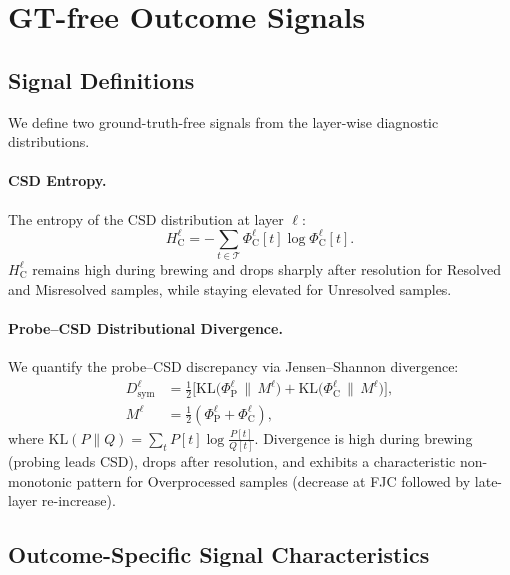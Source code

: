 
\section{GT-free Outcome Signals}
\label{app:ground_truth_free_discrimination}

\subsection{Signal Definitions}
\label{app:subsec:gtfree_signal_definitions}

We define two ground-truth-free signals from the layer-wise diagnostic distributions.

\paragraph{CSD Entropy.}
The entropy of the CSD distribution at layer $\ell$:
\begin{equation}
\label{eq:csd_entropy}
H_{\mathrm{C}}^\ell = -\sum_{t \in \mathcal{T}} \Phi_{\mathrm{C}}^\ell[t] \log \Phi_{\mathrm{C}}^\ell[t].
\end{equation}
$H_{\mathrm{C}}^\ell$ remains high during brewing and drops sharply after resolution for Resolved and Misresolved samples, while staying elevated for Unresolved samples.

\paragraph{Probe--CSD Distributional Divergence.}
We quantify the probe--CSD discrepancy via Jensen--Shannon divergence:
\begin{align}
\label{eq:probe_csd_divergence}
D_{\mathrm{sym}}^\ell &= \frac{1}{2}\Big[\mathrm{KL}\big(\Phi_{\mathrm{P}}^\ell \,\|\, M^\ell\big) + \mathrm{KL}\big(\Phi_{\mathrm{C}}^\ell \,\|\, M^\ell\big)\Big], \nonumber \\
M^\ell &= \frac{1}{2}(\Phi_{\mathrm{P}}^\ell + \Phi_{\mathrm{C}}^\ell),
\end{align}
where $\mathrm{KL}(P\|Q) = \sum_t P[t]\log\frac{P[t]}{Q[t]}$.
Divergence is high during brewing (probing leads CSD), drops after resolution, and exhibits a characteristic non-monotonic pattern for Overprocessed samples (decrease at FJC followed by late-layer re-increase).

\subsection{Outcome-Specific Signal Characteristics}
\label{app:subsec:gtfree_outcome_signatures}

